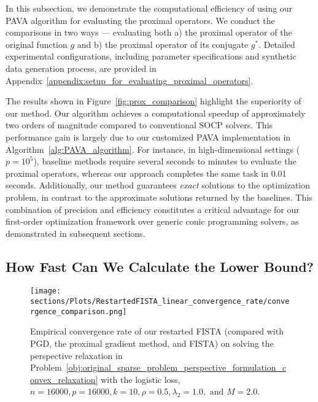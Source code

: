 In this subsection, we demonstrate the computational efficiency of using our PAVA algorithm for evaluating the proximal operators.
We conduct the comparisons in two ways --- evaluating both a) the proximal operator of the original function $g$ and b) the proximal operator of its conjugate $g^*$.
Detailed experimental configurations, including parameter specifications and synthetic data generation process, are provided in Appendix~\ref{appendix:setup_for_evaluating_proximal_operators}.

The results shown in Figure~\ref{fig:prox_comparison} highlight the superiority of our method.
Our algorithm achieves a computational speedup of  approximately two orders of magnitude compared to conventional SOCP solvers.
This performance gain is largely due to our customized PAVA implementation in Algorithm~\ref{alg:PAVA_algorithm}.
For instance, in high-dimensional settings ($p=10^5$), baseline methods require several seconds to minutes to evaluate the proximal operators, whereas our approach completes the same task in 0.01 seconds.
Additionally, our method guarantees \textit{exact} solutions to the optimization problem, in contrast to the approximate solutions returned by the baselines.
This combination of precision and efficiency constitutes a critical advantage for our first-order optimization framework over generic conic programming solvers, as demonstrated in subsequent sections.

\vspace{-2mm}
\subsection{How Fast Can We Calculate the Lower Bound?}
\vspace{-1mm}

\begin{figure*}[!htb]
    \centering
    \texttt{[image: sections/Plots/RestartedFISTA\_linear\_convergence\_rate/convergence\_comparison.png]}
    \vspace{-2mm}
    \caption{Empirical convergence rate of our restarted FISTA (compared with PGD, the proximal gradient method, and FISTA) on solving the perspective relaxation in Problem~\eqref{obj:original_sparse_problem_perspective_formulation_convex_relaxation} with the logistic loss, $n=16000, p=16000, k=10, \rho=0.5, \lambda_2=1.0, \text{ and } M=2.0$. }
    \label{fig:RestartedFISTA_linear_convergence_rate}
    \vspace{-3mm}
\end{figure*}


